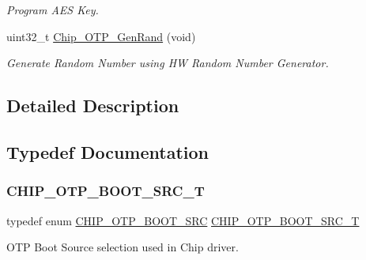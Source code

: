 \begin{DoxyCompactItemize}
\begin{DoxyCompactList}\small\item\em Program A\+ES Key. \end{DoxyCompactList}\item 
uint32\+\_\+t \hyperlink{group___o_t_p__18_x_x__43_x_x_gaabb646c42cbd57630ec23816c115a7a0}{Chip\+\_\+\+O\+T\+P\+\_\+\+Gen\+Rand} (void)
\begin{DoxyCompactList}\small\item\em Generate Random Number using HW Random Number Generator. \end{DoxyCompactList}\end{DoxyCompactItemize}


\subsection{Detailed Description}


\subsection{Typedef Documentation}
\mbox{\label{group___o_t_p__18_x_x__43_x_x_gada36d39d34c8821f0416a852faa926f6}} 
\subsubsection{\texorpdfstring{C\+H\+I\+P\+\_\+\+O\+T\+P\+\_\+\+B\+O\+O\+T\+\_\+\+S\+R\+C\+\_\+T}{CHIP\_OTP\_BOOT\_SRC\_T}}
{\footnotesize\ttfamily typedef enum \hyperlink{group___o_t_p__18_x_x__43_x_x_ga6e90c3dfad51a2a8591e531b0a788134}{C\+H\+I\+P\+\_\+\+O\+T\+P\+\_\+\+B\+O\+O\+T\+\_\+\+S\+RC}  \hyperlink{group___o_t_p__18_x_x__43_x_x_gada36d39d34c8821f0416a852faa926f6}{C\+H\+I\+P\+\_\+\+O\+T\+P\+\_\+\+B\+O\+O\+T\+\_\+\+S\+R\+C\+\_\+T}}



O\+TP Boot Source selection used in Chip driver. 



